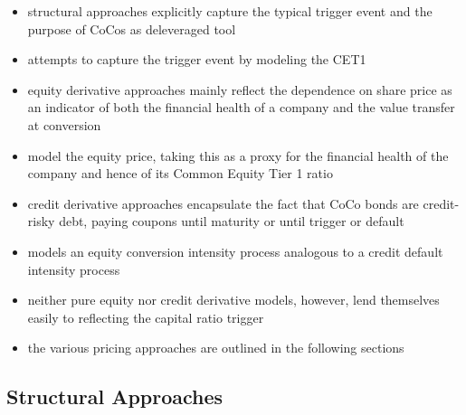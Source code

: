 \begin{itemize}
\item structural approaches explicitly capture the typical trigger event and the purpose of CoCos as deleveraged tool
\item attempts to capture the trigger event by modeling the CET1 
\item equity derivative approaches mainly reflect the dependence on share price as an indicator of both the financial health of a company and the value transfer at conversion
\item model the equity price, taking this as a proxy for the financial health of the company and hence of its Common Equity Tier 1 ratio
\item credit derivative approaches encapsulate the fact that CoCo bonds are credit-risky debt, paying coupons until maturity or until trigger or default
\item models an equity conversion intensity process analogous to a credit default intensity process
\item neither pure equity nor credit derivative models, however, lend themselves easily to reflecting the capital ratio trigger
\item the various pricing approaches are outlined in the following sections
\end{itemize}

\subsection*{Structural Approaches}

